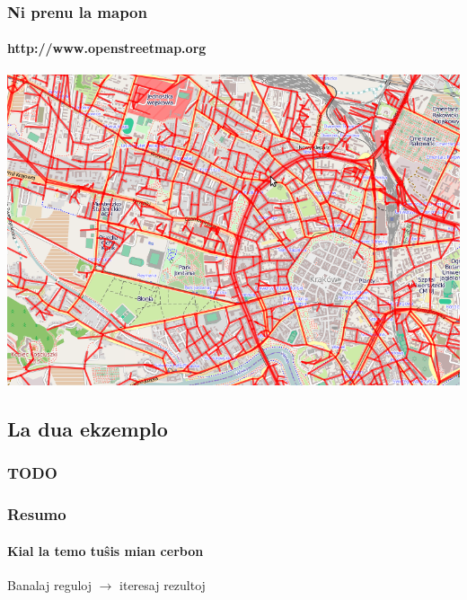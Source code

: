 \documentclass{beamer}
\begin{document}
  \begin{frame}
    \frametitle{Ni prenu la mapon}
    \framesubtitle{http://www.openstreetmap.org}
	\begin{center}
		\includegraphics[scale=0.4]{krakovo}    
	\end{center}
  \end{frame}
  
  \subsection{La dua ekzemplo}
  \begin{frame}
  	\frametitle{TODO}
  	\framesubtitle{}
  \end{frame}
  \begin{frame}
  	\frametitle{Resumo}
  	\framesubtitle{Kial la temo tuŝis mian cerbon}
    Banalaj reguloj $\rightarrow$ iteresaj rezultoj 
  \end{frame}
\end{document}
